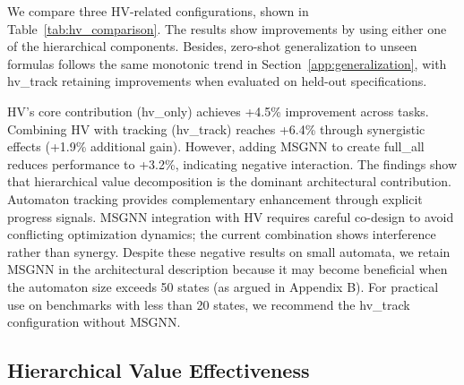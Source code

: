 \documentclass[journal]{IEEEtran}
\begin{document}
We compare three HV-related configurations, shown in Table~\ref{tab:hv_comparison}. The results show improvements by using either one of the hierarchical components. Besides, zero-shot generalization to unseen formulas follows the same monotonic trend in Section~\ref{app:generalization}, with hv\_track retaining improvements when evaluated on held-out specifications.



HV's core contribution (hv\_only) achieves +4.5\% improvement across tasks. Combining HV with tracking (hv\_track) reaches +6.4\% through synergistic effects (+1.9\% additional gain). However, adding MSGNN to create full\_all reduces performance to +3.2\%, indicating negative interaction. The findings show that hierarchical value decomposition is the dominant architectural contribution. Automaton tracking provides complementary enhancement through explicit progress signals. MSGNN integration with HV requires careful co-design to avoid conflicting optimization dynamics; the current combination shows interference rather than synergy. Despite these negative results on small automata, we retain MSGNN in the architectural description because it may become beneficial when the automaton size exceeds 50 states (as argued in Appendix B). For practical use on benchmarks with less than 20 states, we recommend the hv\_track configuration without MSGNN.

\begin{table}[t]
\centering
\caption{HV Improvements with 95\% Confidence Intervals (500 evaluation episodes)}
\label{tab:hv_significance}
\end{table}

\subsection{Hierarchical Value Effectiveness}
\end{document}
